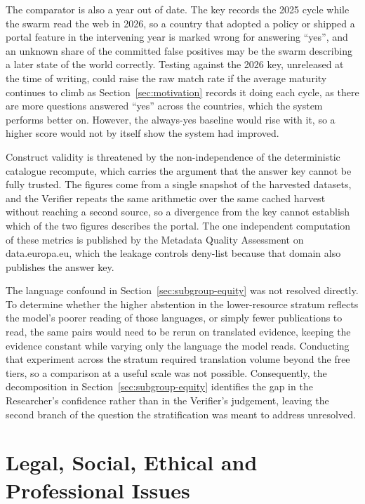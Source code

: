 The comparator is also a year out of date. The key records the 2025 cycle while the swarm read the web in 2026, so a country that adopted a policy or shipped a portal feature in the intervening year is marked wrong for answering ``yes'', and an unknown share of the committed false positives may be the swarm describing a later state of the world correctly. Testing against the 2026 key, unreleased at the time of writing, could raise the raw match rate if the average maturity continues to climb as Section~\ref{sec:motivation} records it doing each cycle, as there are more questions answered ``yes'' across the countries, which the system performs better on. However, the always-yes baseline would rise with it, so a higher score would not by itself show the system had improved.

Construct validity is threatened by the non-independence of the deterministic catalogue recompute, which carries the argument that the answer key cannot be fully trusted. The figures come from a single snapshot of the harvested datasets, and the Verifier repeats the same arithmetic over the same cached harvest without reaching a second source, so a divergence from the key cannot establish which of the two figures describes the portal. The one independent computation of these metrics is published by the Metadata Quality Assessment on data.europa.eu, which the leakage controls deny-list because that domain also publishes the answer key.

The language confound in Section~\ref{sec:subgroup-equity} was not resolved directly. To determine whether the higher abstention in the lower-resource stratum reflects the model's poorer reading of those languages, or simply fewer publications to read, the same pairs would need to be rerun on translated evidence, keeping the evidence constant while varying only the language the model reads. Conducting that experiment across the stratum required translation volume beyond the free tiers, so a comparison at a useful scale was not possible. Consequently, the decomposition in Section~\ref{sec:subgroup-equity} identifies the gap in the Researcher's confidence rather than in the Verifier's judgement, leaving the second branch of the question the stratification was meant to address unresolved.

\section{Legal, Social, Ethical and Professional Issues}\label{sec:lsep}

